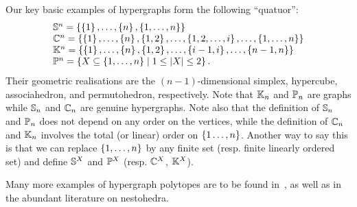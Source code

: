 \begin{example}
    Our key basic examples of hypergraphs form the following ``quatuor'':
$$\begin{array}{lll}
{\mathbb S}^n=\left\{\left\{1\right\},\ldots,\left\{n\right\},\left\{1,\ldots,n\right\}\right\} \\
{\mathbb C}^n= \left\{\left\{1\right\},\ldots,\left\{n\right\},\left\{1,2\right\},\ldots,\left\{1,2,\ldots,i\right\},\ldots,\left\{1,\ldots,n\right\}\right\}\\
{\mathbb K}^n= \left\{\left\{1\right\},\ldots,\left\{n\right\},\left\{1,2\right\},\ldots,\left\{i-1,i\right\},\ldots,\left\{n-1,n\right\}\right\}\\
{\mathbb P}^n=\left\{X\subseteq\left\{1,\ldots,n\right\} \mid 1\leq |X|\leq 2\right\}.
\end{array}$$
Their geometric realisations are the $(n-1)$-dimensional simplex,  hypercube,  associahedron, and permutohedron, respectively. 
Note that ${\mathbb K}_n$ and ${\mathbb P}_n$ are graphs while ${\mathbb S}_n$ and ${\mathbb C}_n$ are genuine hypergraphs. 
Note also that the definition of ${\mathbb S}_n$ and ${\mathbb P}_n$ does not depend on any order on the vertices, while the definition of ${\mathbb C}_n$ and ${\mathbb K}_n$ involves the total (or linear) order on $\left\{1\ldots,n\right\}$. 
Another way to say this is that we can replace $\left\{1,\ldots,n\right\}$ by any finite set (resp. finite linearly ordered set) and define ${\mathbb S}^X$ and ${\mathbb P}^X$ (resp. ${\mathbb C}^X$, ${\mathbb K}^X$).
\end{example}

Many more examples of  hypergraph polytopes are to be found in~\cite{DP-HP,COI,CDOO}, as well as in the abundant literature on nestohedra.


